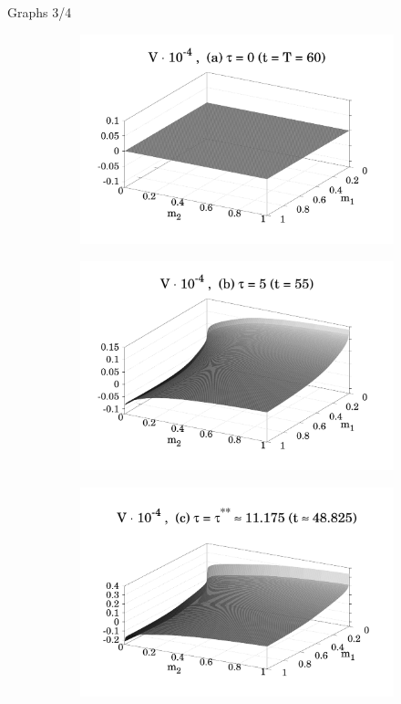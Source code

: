 \documentclass{beamer}
\begin{document}
\begin{frame}{Graphs 3/4}
    \begin{figure}
        \centering
        \begin{subfigure}{.48 \textwidth}
            \includegraphics[width = \textwidth]{figures/Figure_4a.pdf}
            \label{fig_4_a}
        \end{subfigure}
        \begin{subfigure}{.48 \textwidth}
            \includegraphics[width = \textwidth]{figures/Figure_4b_1.pdf}
            \label{fig_4_b}
        \end{subfigure}
        \begin{subfigure}{.48 \textwidth}
            \includegraphics[width = \textwidth]{figures/Figure_4c_1.pdf}

\end{subfigure}
\end{figure}
\end{frame}
\end{document}
